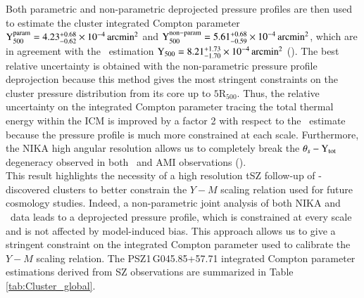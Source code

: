 \documentclass[traditabstract]{aa}
\begin{document}
Both parametric and non-parametric deprojected pressure profiles are then used to estimate the cluster integrated Compton parameter \mbox{$\rm{Y_{500}^{param}} = 4.23^{+0.68}_{-0.62} \times 10^{-4} \, \mathrm{arcmin^2}$} and \mbox{$\rm{Y_{500}^{non-param}} = 5.61^{+0.68}_{-0.59} \times 10^{-4} \, \rm{arcmin^2}$}, which are in agreement with the \planck\ estimation \mbox{$\rm{Y_{500}} = 8.21^{+1.73}_{-1.70} \times 10^{-4} \, \mathrm{arcmin^2}$} (\citealt{PSZ1_updated}). The best relative uncertainty is obtained with the non-parametric pressure profile deprojection because this method gives the most stringent constraints on the cluster pressure distribution from its core up to $5\mathrm{R_{500}}$. Thus, the relative uncertainty on the integrated Compton parameter tracing the total thermal energy within the ICM is improved by a factor 2 with respect to the \planck\ estimate because the pressure profile is much more constrained at each scale. Furthermore, the NIKA high angular resolution allows us to completely break the $\theta_s - \rm{Y_{tot}}$ degeneracy observed in both \planck\ and AMI observations (\citealt{AMI_followup}).\\
\indent This result highlights the necessity of a high resolution tSZ follow-up of \planck-discovered clusters to better constrain the $Y-M$ scaling relation used for future cosmology studies. Indeed, a non-parametric joint analysis of both NIKA and \planck\ data leads to a deprojected pressure profile, which is constrained at every scale and is not affected by model-induced bias. This approach allows us to give a stringent constraint on the integrated Compton parameter used to calibrate the $Y-M$ scaling relation. The \mbox{PSZ1\,G045.85+57.71} integrated Compton parameter estimations derived from SZ observations are summarized in Table \ref{tab:Cluster_global}.

\end{document}
